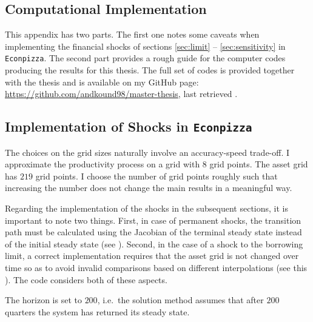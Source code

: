 \documentclass[12pt]{article} %
\numberwithin{equation}{section} %
\numberwithin{figure}{section}
\numberwithin{table}{section}
\begin{document}
\begin{refsection}
\begin{appendices}
\thispagestyle{plain}
\section{Computational Implementation}
\label{sec-app:codes}

This appendix has two parts. The first one notes some caveats when implementing the financial shocks of sections \ref{sec:limit} -- \ref{sec:sensitivity} in \texttt{Econpizza}. The second part provides a rough guide for the computer codes producing the results for this thesis. The full set of codes is provided together with the thesis and is available on my GitHub page: \url{https://github.com/andkound98/master-thesis}, last retrieved .

\subsection{Implementation of Shocks in \texttt{Econpizza}}
\label{sec-app:codes-ep}

The choices on the grid sizes naturally involve an accuracy-speed trade-off. I approximate the productivity process on a grid with $8$ grid points. The asset grid has $219$ grid points. I choose the number of grid points roughly such that increasing the number does not change the main results in a meaningful way.

Regarding the implementation of the shocks in the subsequent sections, it is important to note two things. First, in case of permanent shocks, the transition path must be calculated using the Jacobian of the terminal steady state instead of the initial steady state (see \cite{auclert2021}). Second, in the case of a shock to the borrowing limit, a correct implementation requires that the asset grid is not changed over time so as to avoid invalid comparisons based on different interpolations (see this \cite{mellior2016mimeo}). The code considers both of these aspects.

The horizon is set to $200$, i.e.~the solution method assumes that after $200$ quarters the system has returned its steady state.



\end{appendices}
\end{refsection}
\end{document}
